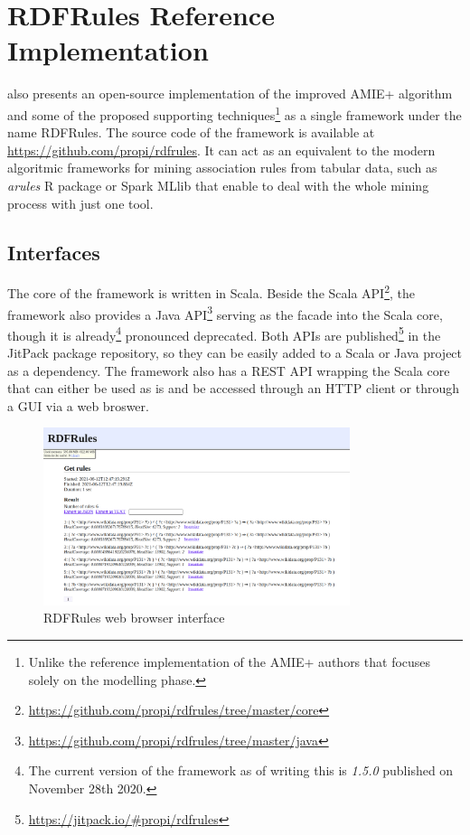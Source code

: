 \chapter{RDFRules Reference Implementation}

\cite{Zeman2020} also presents an open-source implementation of the improved AMIE+ algorithm and some of the proposed supporting techniques\footnote{Unlike the reference implementation of the AMIE+ authors that focuses solely on the modelling phase.} as a single framework under the name RDFRules. The source code of the framework is available at \href{https://github.com/propi/rdfrules}{https://github.com/propi/rdfrules}. It can act as an equivalent to the modern algoritmic frameworks for mining association rules from tabular data, such as \textit{arules} R package or Spark MLlib that enable to deal with the whole mining process with just one tool.

\section{Interfaces}

The core of the framework is written in Scala. Beside the Scala API\footnote{\href{https://github.com/propi/rdfrules/tree/master/core}{https://github.com/propi/rdfrules/tree/master/core}}, the framework also provides a Java API\footnote{\href{https://github.com/propi/rdfrules/tree/master/java}{https://github.com/propi/rdfrules/tree/master/java}} serving as the facade into the Scala core, though it is already\footnote{The current version of the framework as of writing this is \textit{1.5.0} published on November 28th 2020.} pronounced deprecated. Both APIs are published\footnote{\href{https://jitpack.io/\#propi/rdfrules}{https://jitpack.io/\#propi/rdfrules}} in the JitPack package repository, so they can be easily added to a Scala or Java project as a dependency. The framework also has a REST API wrapping the Scala core that can either be used as is and be accessed through an HTTP client or through a GUI via a web broswer.

\begin{figure}[h]
\centering
\includegraphics[width=0.8\textwidth]{img/gui-getrules.png}
\caption{RDFRules web browser interface}
\label{rdfrulesgui}
\end{figure}

